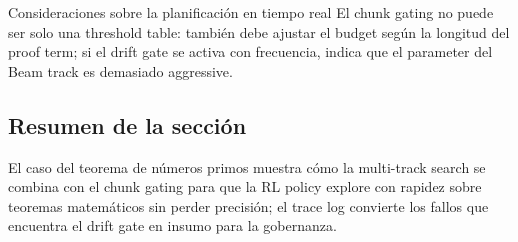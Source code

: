 \begin{warningbox}{Consideraciones sobre la planificación en tiempo real}
El chunk gating no puede ser solo una threshold table: también debe ajustar el budget según la longitud del proof term; si el drift gate se activa con frecuencia, indica que el parameter del Beam track es demasiado aggressive.
\end{warningbox}

\subsection{Resumen de la sección}
El caso del teorema de números primos muestra cómo la multi-track search se combina con el chunk gating para que la RL policy explore con rapidez sobre teoremas matemáticos sin perder precisión; el trace log convierte los fallos que encuentra el drift gate en insumo para la gobernanza.
\newpage
